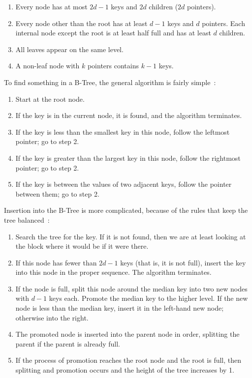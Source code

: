 \begin{enumerate}
	\item Every node has at most $2d-1$ keys and $2d$ children ($2d$ pointers).
	\item Every node other than the root has at least $d-1$ keys and $d$ pointers. Each internal node except the root is at least half full and has at least $d$ children.
	\item All leaves appear on the same level.
	\item A non-leaf node with $k$ pointers contains $k-1$ keys.
\end{enumerate}

To find something in a B-Tree, the general algorithm is fairly simple~\cite{osi}:

\begin{enumerate}
	\item Start at the root node. 
	\item If the key is in the current node, it is found, and the algorithm terminates.
	\item If the key is less than the smallest key in this node, follow the leftmost pointer; go to step 2.
	\item If the key is greater than the largest key in this node, follow the rightmost pointer; go to step 2.
	\item If the key is between the values of two adjacent keys, follow the pointer between them; go to step 2.
\end{enumerate}


Insertion into the B-Tree is more complicated, because of the rules that keep the tree balanced~\cite{osi}:

\begin{enumerate}
	\item Search the tree for the key. If it is not found, then we are at least looking at the block where it would be if it were there.
	\item If this node has fewer than $2d-1$ keys (that is, it is not full), insert the key into this node in the proper sequence. The algorithm terminates.
	\item If the node is full, split this node around the median key into two new nodes with $d-1$ keys each. Promote the median key to the higher level. If the new node is less than the median key, insert it in the left-hand new node; otherwise into the right.
	\item The promoted node is inserted into the parent node in order, splitting the parent if the parent is already full.
	\item If the process of promotion reaches the root node and the root is full, then splitting and promotion occurs and the height of the tree increases by 1.
\end{enumerate}

